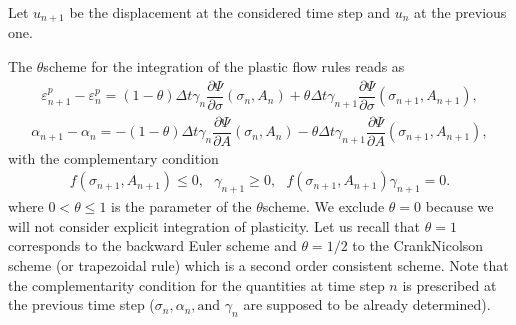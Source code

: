 \documentclass[a4paper,11pt,english]{sphinxmanual}
\begin{document}
Let \(u_{n+1}\) be the displacement at the considered time step and  \(u_{n}\) at the previous one.

The \(\theta\)\sphinxhyphen{}scheme for the integration of the plastic flow rules reads as
\begin{equation}\label{equation:userdoc/model_plasticity_small_strain:thetascheme1}
\begin{split}\varepsilon^p_{n+1} - \varepsilon^p_{n} = (1-\theta)\Delta t \gamma_n \dfrac{\partial \Psi}{\partial \sigma}(\sigma_{n}, A_{n}) + \theta \Delta t \gamma_{n+1} \dfrac{\partial \Psi}{\partial \sigma}(\sigma_{n+1}, A_{n+1}),\end{split}
\end{equation}\begin{equation}\label{equation:userdoc/model_plasticity_small_strain:thetascheme2}
\begin{split}\alpha_{n+1} - \alpha_n = -(1-\theta)\Delta t \gamma_n \dfrac{\partial \Psi}{\partial A}(\sigma_{n}, A_{n}) - \theta\Delta t \gamma_{n+1} \dfrac{\partial \Psi}{\partial A}(\sigma_{n+1}, A_{n+1}),\end{split}
\end{equation}
with the complementary condition
\begin{equation*}
\begin{split}f(\sigma_{n+1}, A_{n+1}) \le 0, ~~~ \gamma_{n+1} \ge 0, ~~~ f(\sigma_{n+1}, A_{n+1}) \gamma_{n+1} = 0.\end{split}
\end{equation*}
where \(0 < \theta \le 1\) is the parameter of the \(\theta\)\sphinxhyphen{}scheme. We exclude \(\theta = 0\) because we will not consider explicit integration of plasticity. Let us recall that \(\theta = 1\) corresponds to the backward Euler scheme and \(\theta = 1/2\) to the Crank\sphinxhyphen{}Nicolson scheme (or trapezoidal rule) which is a second order consistent scheme. Note that the complementarity condition for the quantities at time step \(n\) is prescribed at the previous time step (\(\sigma_{n}, \alpha_n, \mbox{and } \gamma_n\) are supposed to be already determined).
\end{document}
